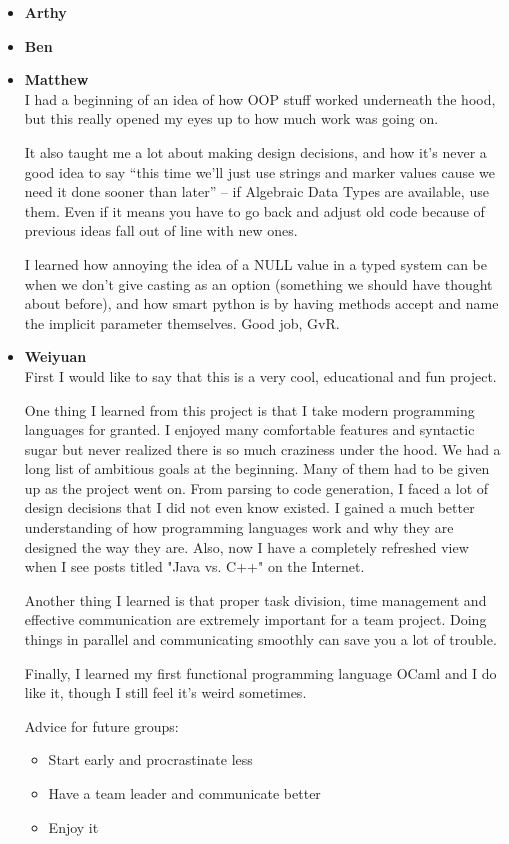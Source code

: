 
\begin{itemize}
\item {\bf Arthy}\\

\item {\bf Ben}\\

\item {\bf Matthew}\\
I had a beginning of an idea of how OOP stuff worked underneath the hood, but this really opened my eyes up to how much work was going on.

It also taught me a lot about making design decisions, and how it's never a good idea to say ``this time we'll just use strings and marker values cause we need it done sooner than later'' -- if Algebraic Data Types are available, use them. Even if it means you 
have to go back and adjust old code because of previous ideas fall out of line with new ones.

I learned how annoying the idea of a NULL value in a typed system can be when we don't give casting as an option (something we should have thought about before), and how smart python is by having methods accept and name the implicit parameter themselves. Good 
job, GvR.

\item {\bf Weiyuan}\\
First I would like to say that this is a very cool, educational and fun project. 

One thing I learned from this project is that I take modern programming languages for granted. I enjoyed many comfortable features and syntactic sugar but never realized there is so much craziness under the hood. We had a long list of ambitious goals at the beginning. Many of them had to be given up as the project went on. From parsing to code generation, I faced a lot of design decisions that I did not even know existed. I gained a much better understanding of how programming languages work and why they are designed the way they are. Also, now I have a completely refreshed view when I see posts titled "Java vs. C++" on the Internet.

Another thing I learned is that proper task division, time management and effective communication are extremely important for a team project. Doing things in parallel and communicating smoothly can save you a lot of trouble.

Finally, I learned my first functional programming language OCaml and I do like it, though I still feel it's weird sometimes.

Advice for future groups:
\begin{itemize}
  \item Start early and procrastinate less
  \item Have a team leader and communicate better
  \item Enjoy it
\end{itemize}

\end{itemize}
